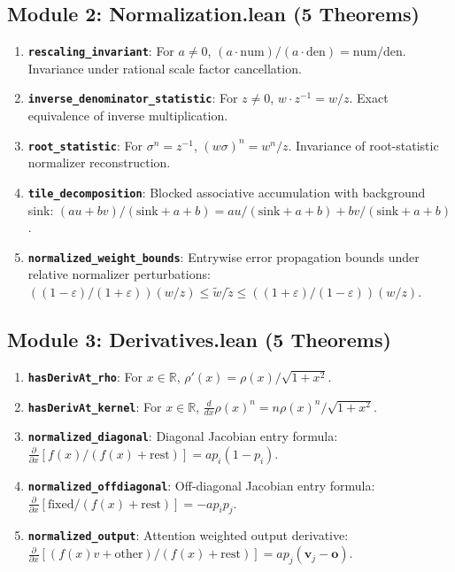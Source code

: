 \documentclass[11pt,a4paper]{article}
\theoremstyle{definition}
\begin{document}
\subsection{Module 2: Normalization.lean (5 Theorems)}
\begin{enumerate}
    \item \textbf{\texttt{rescaling\_invariant}}: For $a \ne 0$, $(a \cdot \text{num}) / (a \cdot \text{den}) = \text{num} / \text{den}$. Invariance under rational scale factor cancellation.
    \item \textbf{\texttt{inverse\_denominator\_statistic}}: For $z \ne 0$, $w \cdot z^{-1} = w / z$. Exact equivalence of inverse multiplication.
    \item \textbf{\texttt{root\_statistic}}: For $\sigma^n = z^{-1}$, $(w \sigma)^n = w^n / z$. Invariance of root-statistic normalizer reconstruction.
    \item \textbf{\texttt{tile\_decomposition}}: Blocked associative accumulation with background sink: $(a u + b v)/(\text{sink} + a + b) = a u / (\text{sink} + a + b) + b v / (\text{sink} + a + b)$.
    \item \textbf{\texttt{normalized\_weight\_bounds}}: Entrywise error propagation bounds under relative normalizer perturbations: $((1 - \varepsilon)/(1 + \varepsilon)) (w/z) \le \widetilde{w}/\widetilde{z} \le ((1 + \varepsilon)/(1 - \varepsilon)) (w/z)$.
\end{enumerate}

\subsection{Module 3: Derivatives.lean (5 Theorems)}
\begin{enumerate}
    \item \textbf{\texttt{hasDerivAt\_rho}}: For $x \in \mathbb{R}$, $\rho'(x) = \rho(x)/\sqrt{1 + x^2}$.
    \item \textbf{\texttt{hasDerivAt\_kernel}}: For $x \in \mathbb{R}$, $\frac{d}{dx}\rho(x)^n = n \rho(x)^n / \sqrt{1 + x^2}$.
    \item \textbf{\texttt{normalized\_diagonal}}: Diagonal Jacobian entry formula: $\frac{\partial}{\partial x}[f(x)/(f(x) + \text{rest})] = a p_i (1 - p_i)$.
    \item \textbf{\texttt{normalized\_offdiagonal}}: Off-diagonal Jacobian entry formula: $\frac{\partial}{\partial x}[\text{fixed}/(f(x) + \text{rest})] = -a p_i p_j$.
    \item \textbf{\texttt{normalized\_output}}: Attention weighted output derivative: $\frac{\partial}{\partial x}[(f(x)v + \text{other})/(f(x) + \text{rest})] = a p_j (\mathbf{v}_j - \mathbf{o})$.
\end{enumerate}
\end{document}
